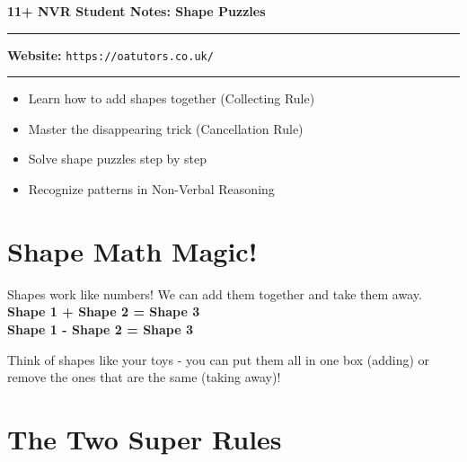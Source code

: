 \documentclass[a4paper,11pt]{article}
\begin{document}
\onehalfspacing


\begin{center}
\textbf{\Large 11+ NVR Student Notes: Shape Puzzles}
\vspace{0.2cm}
\end{center}

\hrule
\vspace{0.1cm}

\textbf{Website:} \texttt{https://oatutors.co.uk/}

\vspace{0.2cm}
\hrule
\vspace{0.3cm}

\begin{tcolorbox}[colback=blue!5!white,colframe=blue!75!black,title=\textbf{What You'll Learn Today}]
\begin{itemize}
    \item Learn how to add shapes together (Collecting Rule)
    \item Master the disappearing trick (Cancellation Rule)
    \item Solve shape puzzles step by step
    \item Recognize patterns in Non-Verbal Reasoning
\end{itemize}
\end{tcolorbox}

\section{Shape Math Magic!}

\begin{tcolorbox}[colback=green!5!white,colframe=green!75!black,title=\textbf{The Big Idea}]
Shapes work like numbers! We can add them together and take them away.
\\
\textbf{Shape 1 + Shape 2 = Shape 3}
\\
\textbf{Shape 1 - Shape 2 = Shape 3}
\end{tcolorbox}

Think of shapes like your toys - you can put them all in one box (adding) or remove the ones that are the same (taking away)!

\section{The Two Super Rules}
\end{document}
